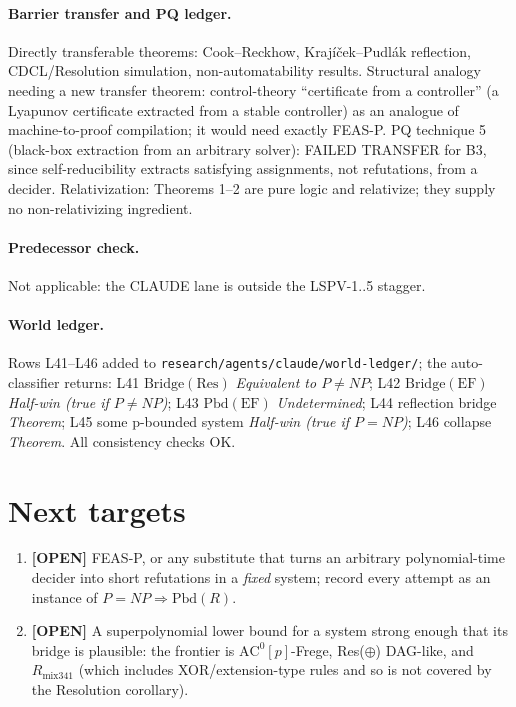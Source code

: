 \documentclass[11pt]{article}
\theoremstyle{definition}
\theoremstyle{remark}
\newcommand{\Br}{\mathrm{Bridge}}
\newcommand{\Pbd}{\mathrm{Pbd}}
\newcommand{\status}[1]{\textbf{[#1]}}
\begin{document}
\paragraph{Barrier transfer and PQ ledger.} Directly transferable theorems: Cook--Reckhow, Kraj\'i\v{c}ek--Pudl\'ak
reflection, CDCL/Resolution simulation, non-automatability results. Structural analogy needing a new transfer
theorem: control-theory ``certificate from a controller'' (a Lyapunov certificate extracted from a stable
controller) as an analogue of machine-to-proof compilation; it would need exactly FEAS-P. PQ technique 5
(black-box extraction from an arbitrary solver): FAILED TRANSFER for B3, since self-reducibility extracts
satisfying assignments, not refutations, from a decider. Relativization: Theorems 1--2 are pure logic and
relativize; they supply no non-relativizing ingredient.

\paragraph{Predecessor check.} Not applicable: the CLAUDE lane is outside the LSPV-1..5 stagger.

\paragraph{World ledger.} Rows L41--L46 added to \texttt{research/agents/claude/world-ledger/}; the
auto-classifier returns: L41 $\Br(\mathrm{Res})$ \emph{Equivalent to $P\ne NP$}; L42 $\Br(\mathrm{EF})$
\emph{Half-win (true if $P\ne NP$)}; L43 $\Pbd(\mathrm{EF})$ \emph{Undetermined}; L44 reflection bridge
\emph{Theorem}; L45 some p-bounded system \emph{Half-win (true if $P=NP$)}; L46 collapse \emph{Theorem}.
All consistency checks OK.

\section{Next targets}
\begin{enumerate}
\item \status{OPEN} FEAS-P, or any substitute that turns an arbitrary polynomial-time decider into
short refutations in a \emph{fixed} system; record every attempt as an instance of $P=NP\Rightarrow\Pbd(R)$.
\item \status{OPEN} A superpolynomial lower bound for a system strong enough that its bridge is plausible:
the frontier is $\mathrm{AC}^0[p]$-Frege, Res($\oplus$) DAG-like, and $R_{\mathrm{mix341}}$ (which includes
XOR/extension-type rules and so is not covered by the Resolution corollary).
\end{enumerate}
\end{document}
